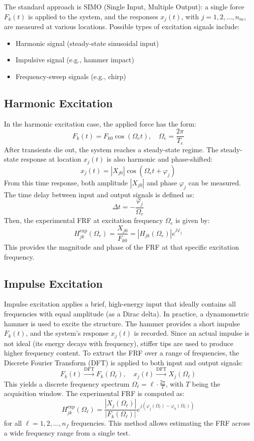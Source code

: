 The standard approach is SIMO (Single Input, Multiple Output): a single force \( F_k(t) \) is applied to the system, and the responses \( x_j(t) \), with \( j = 1, 2, \ldots, n_m \), are measured at various locations. Possible types of excitation signals include:
\begin{itemize}
    \item Harmonic signal (steady-state sinusoidal input)
    \item Impulsive signal (e.g., hammer impact)
    \item Frequency-sweep signals (e.g., chirp)
\end{itemize}

\subsection{Harmonic Excitation}

In the harmonic excitation case, the applied force has the form:
\[
F_k(t) = F_{k0} \cos(\Omega_e t), \quad \Omega_e = \frac{2\pi}{T_e}
\]
After transients die out, the system reaches a steady-state regime. The steady-state response at location \( x_j(t) \) is also harmonic and phase-shifted:
\[
x_j(t) = |X_{j0}| \cos(\Omega_e t + \varphi_j)
\]
From this time response, both amplitude \( |X_{j0}| \) and phase \( \varphi_j \) can be measured. The time delay between input and output signals is defined as:
\[
\Delta t = -\frac{\varphi_j}{\Omega_e}
\]
Then, the experimental FRF at excitation frequency \( \Omega_e \) is given by:
\[
H_{jk}^{\text{exp}}(\Omega_e) = \frac{X_{j0}}{F_{k0}} = |H_{jk}(\Omega_e)| e^{j \varphi_j}
\]
This provides the magnitude and phase of the FRF at that specific excitation frequency.

\subsection{Impulse Excitation}

Impulse excitation applies a brief, high-energy input that ideally contains all frequencies with equal amplitude (as a Dirac delta). In practice, a dynamometric hammer is used to excite the structure. The hammer provides a short impulse \( F_k(t) \), and the system's response \( x_j(t) \) is recorded. Since an actual impulse is not ideal (its energy decays with frequency), stiffer tips are used to produce higher frequency content. To extract the FRF over a range of frequencies, the Discrete Fourier Transform (DFT) is applied to both input and output signals:
\[
F_k(t) \xrightarrow{\text{DFT}} F_k(\Omega_\ell), \quad x_j(t) \xrightarrow{\text{DFT}} X_j(\Omega_\ell)
\]
This yields a discrete frequency spectrum \( \Omega_\ell = \ell \cdot \frac{2\pi}{T} \), with \( T \) being the acquisition window. The experimental FRF is computed as:
\[
H_{jk}^{\text{exp}}(\Omega_\ell) = \frac{|X_j(\Omega_\ell)|}{|F_k(\Omega_\ell)|} e^{j(\varphi_j(\Omega_\ell) - \varphi_k(\Omega_\ell))}
\]
for all \( \ell = 1, 2, \ldots, n_f \) frequencies. This method allows estimating the FRF across a wide frequency range from a single test.

